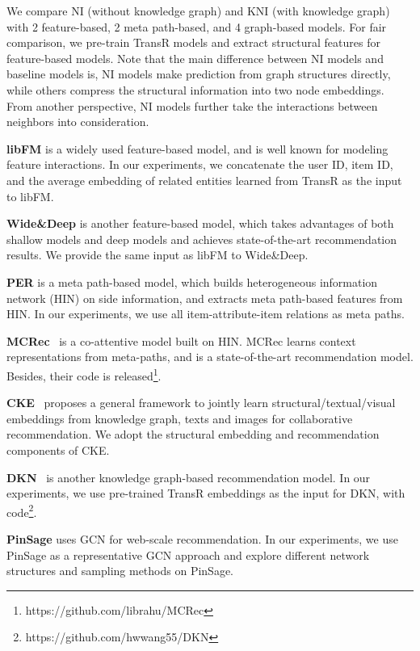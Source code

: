 \documentclass[sigconf]{acmart}
\newcommand{\new}[1]{{\color{black} #1}}
\begin{document}
We compare NI (without knowledge graph) and KNI (with knowledge graph) with 2 feature-based, 2 meta path-based, and 4 graph-based models. For fair comparison, we pre-train TransR models and extract structural features for feature-based models. \new{Note that the main difference between NI models and baseline models is, NI models make prediction from graph structures directly, while others compress the structural information into two node embeddings. From another perspective, NI models further take the interactions between neighbors into consideration.}

\textbf{libFM} \cite{rendle2010factorization} is a widely used feature-based model, and is well known for modeling feature interactions. In our experiments, we concatenate the user ID, item ID, and the average embedding of related entities learned from TransR \cite{lin2015learning} as the input to libFM.

\textbf{Wide\&Deep} \cite{cheng2016wide} is another feature-based model, which takes  advantages of both shallow models and deep models and achieves state-of-the-art recommendation results. We provide the same input as libFM to Wide\&Deep.

\textbf{PER} \cite{yu2014personalized} is a meta path-based model, which builds heterogeneous information network (HIN) on side information, and extracts meta path-based features from HIN. 
In our experiments, we use all item-attribute-item relations as meta paths. 

\textbf{MCRec}~\cite{hu2018leveraging} is a co-attentive model built on HIN. MCRec learns context representations from meta-paths, and is a state-of-the-art recommendation model. Besides, their code is released\footnote{https://github.com/librahu/MCRec}.

\textbf{CKE}~\cite{zhang2016collaborative} proposes a general framework to jointly learn structural/textual/visual embeddings from knowledge graph, texts and images for collaborative recommendation. We adopt the structural embedding and recommendation components of CKE.

\textbf{DKN}~\cite{wang2018dkn} is another knowledge graph-based recommendation model. In our experiments, we use pre-trained TransR embeddings as the input for DKN, with code\footnote{https://github.com/hwwang55/DKN}.

\textbf{PinSage} \cite{ying2018graph} uses GCN for web-scale recommendation. 
In our experiments, we use PinSage as a representative GCN approach and explore different network structures and sampling methods on PinSage.
\end{document}
